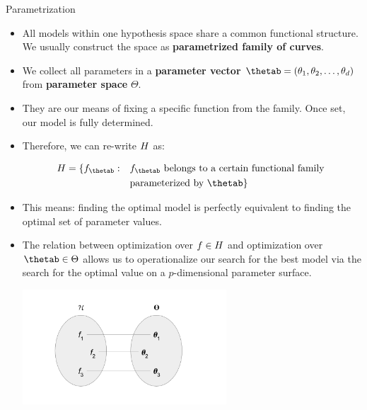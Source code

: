\documentclass[11pt,compress,t,notes=noshow, xcolor=table]{beamer}
\begin{document}
\begin{vbframe}{Parametrization}

\begin{itemize}
  
  \item All models within one hypothesis space share a common functional 
  structure. We usually construct the space as 
  \textbf{parametrized family of curves}.
  
  
  \item We collect all parameters in a \textbf{parameter vector} 
  $\thetab = (\theta_1, \theta_2, \ldots, \theta_d)$ from \textbf{parameter space} 
  $\Theta$.
  
  \item They are our means of fixing a specific function from the family. 
      Once set, our model is fully determined.
  
  \item Therefore, we can re-write $H$ as:

  \begin{equation*}
    \begin{split}
      \Hspace = \{f_{\thetab}: \quad & f_{\thetab} \text{ belongs to a certain
       functional family } \\
       & \text{parameterized by } \thetab\}
    \end{split}
  \end{equation*}
  
  
  \framebreak
  
  \item This means: finding the optimal model is perfectly equivalent to 
  finding the optimal set of parameter values.
  
  \item The relation between optimization over $f \in H$ and 
  optimization over $\thetab \in \Theta$ allows us to operationalize our search
  for the best model via the search for the optimal value on a $p$-dimensional
  parameter surface.
  
  \begin{center}
    \includegraphics[width = 0.6\textwidth]{figure_man/bijection_f_theta.PNG} 
  \end{center}
  

\end{itemize}
\end{vbframe}
\end{document}
